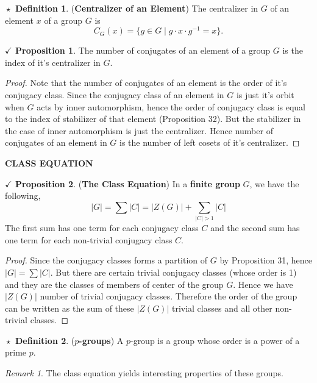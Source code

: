 \documentclass{article}
\theoremstyle{definition}
\newtheorem{definition}{$\boxed{\star}$ Definition}
\theoremstyle{remark}
\newtheorem*{remark}{Remark}
\theoremstyle{definition}
\theoremstyle{definition}
\newtheorem{proposition}{$\checkmark$ Proposition}
\theoremstyle{definition}
\theoremstyle{proof}
\newcommand{\inv}[1]{#1^{-1}}
\newcommand{\order}[1]{\left\vert #1 \right\vert}
\begin{document}
\hrulefill
\begin{definition}
	(\textbf{Centralizer of an Element}) The centralizer in $ G $ of an element $ x $ of a group $ G $ is
	\[C_G(x) = \{g\in G\;\vert\;g\cdot x \cdot \inv{g} = x\}.\]
\end{definition}
\hrulefill
\begin{proposition}
	The number of conjugates of an element of a group $ G $ is the index of it's centralizer in $ G $.
\end{proposition}
\begin{proof}
	Note that the number of conjugates of an element is the order of it's conjugacy class. Since the conjugacy class of an element in $ G $ is just it's orbit when $ G $ acts by inner automorphism, hence the  order of conjugacy class is equal to the index of stabilizer of that element (Proposition 32). But the stabilizer in the case of inner automorphism is just the centralizer. Hence number of conjugates of an element in $ G $ is the number of left cosets of it's centralizer.
\end{proof}
\hrulefill
\textbf{CLASS EQUATION}
\hrulefill
\begin{proposition}
	(\textbf{The Class Equation}) In a \textbf{finite group} $ G $, we have the following,
	\begin{equation}\label{ClassEquation}
		\boxed{\order{G} = \sum \order{C} = \order{Z(G)} + \sum_{\order{C}>1}\order{C}}
	\end{equation}
	The first sum has one term for each conjugacy class $ C $ and the second sum has one term for each non-trivial conjugacy class $ C $.
\end{proposition}
\begin{proof}
	Since the conjugacy classes forms a partition of $ G $ by Proposition 31, hence $  \order{G} = \sum \order{C}$. But there are certain trivial conjugacy classes (whose order is 1) and they are the classes of members of center of the group $ G $. Hence we have $ \order{Z(G)} $ number of trivial conjugacy classes. Therefore the order of the group can be written as the sum of these $ \order{Z(G)} $ trivial classes and all other non-trivial classes.  
\end{proof}
\hrulefill
\begin{definition}
	(\textbf{$ p $-groups}) A $ p $-group is a group whose order is a power of a prime $ p $. 
\end{definition}
\begin{remark}
	The class equation yields interesting properties of these groups.
\end{remark}
\end{document}
